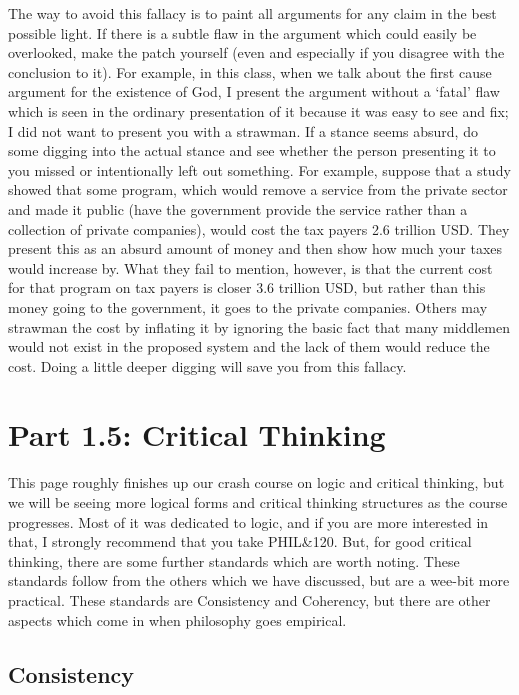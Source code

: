 The way to avoid this fallacy is to paint all arguments for any claim in the best possible light. If there is a subtle flaw in the argument which could easily be overlooked, make the patch yourself (even and especially if you disagree with the conclusion to it). For example, in this class, when we talk about the first cause argument for the existence of God, I present the argument without a `fatal' flaw which is seen in the ordinary presentation of it because it was easy to see and fix; I did not want to present you with a strawman.  If a stance seems absurd, do some digging into the actual stance and see whether the person presenting it to you missed or intentionally left out something. For example, suppose that a study showed that some program, which would remove a service from the private sector and made it public (have the government provide the service rather than a collection of private companies), would cost the tax payers 2.6 trillion USD. They present this as an absurd amount of money and then show how much your taxes would increase by. What they fail to mention, however, is that the current cost for that program on tax payers is closer 3.6 trillion USD, but rather than this money going to the government, it goes to the private companies. Others may strawman the cost by inflating it by ignoring the basic fact that many middlemen would not exist in the proposed system and the lack of them would reduce the cost. Doing a little deeper digging will save you from this fallacy. 

\section{Part 1.5: Critical Thinking}

This page roughly finishes up our crash course on logic and critical thinking, but we will be seeing more logical forms and critical thinking structures as the course progresses. Most of it was dedicated to logic, and if you are more interested in that, I strongly recommend that you take PHIL\&120. But, for good critical thinking, there are some further standards which are worth noting. These standards follow from the others which we have discussed, but are a wee-bit more practical. These standards are Consistency and Coherency, but there are other aspects which come in when philosophy goes empirical.

\subsection{Consistency}


